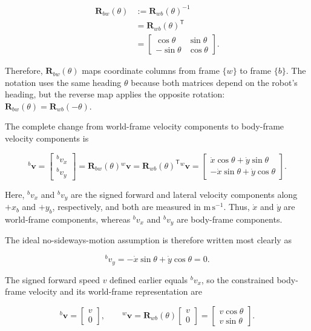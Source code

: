 \documentclass[
  australian,
  12pt,
  letterpaper,
  DIV=11,
  numbers=noendperiod,
  twoside]{scrreprt}
\begin{document}
\[
\begin{aligned}
\mathbf R_{bw}(\theta)
&\mathrel{:=}
\mathbf R_{wb}(\theta)^{-1}\\
&=
\mathbf R_{wb}(\theta)^{\mathsf T}\\
&=
\begin{bmatrix}
\cos\theta & \sin\theta\\
-\sin\theta & \cos\theta
\end{bmatrix}.
\end{aligned}
\]

Therefore, \(\mathbf R_{bw}(\theta)\) maps coordinate columns from frame
\(\{w\}\) to frame \(\{b\}\). The notation uses the same heading
\(\theta\) because both matrices depend on the robot's heading, but the
reverse map applies the opposite rotation:
\(\mathbf R_{bw}(\theta)=\mathbf R_{wb}(-\theta)\).

The complete change from world-frame velocity components to body-frame
velocity components is

\[
{}^{b}\mathbf v
=
\begin{bmatrix}
{}^{b}v_x\\
{}^{b}v_y
\end{bmatrix}
=
\mathbf R_{bw}(\theta){}^{w}\mathbf v
=
\mathbf R_{wb}(\theta)^{\mathsf T}{}^{w}\mathbf v
=
\begin{bmatrix}
\dot x\cos\theta+\dot y\sin\theta\\
-\dot x\sin\theta+\dot y\cos\theta
\end{bmatrix}.
\]

Here, \({}^{b}v_x\) and \({}^{b}v_y\) are the signed forward and lateral
velocity components along \(+x_b\) and \(+y_b\), respectively, and both
are measured in \(\mathrm{m\,s^{-1}}\). Thus, \(\dot x\) and \(\dot y\)
are world-frame components, whereas \({}^{b}v_x\) and \({}^{b}v_y\) are
body-frame components.

The ideal no-sideways-motion assumption is therefore written most
clearly as

\[
\boxed{
{}^{b}v_y
=
-\dot x\sin\theta+
\dot y\cos\theta
=
0
}.
\]

The signed forward speed \(v\) defined earlier equals \({}^{b}v_x\), so
the constrained body-frame velocity and its world-frame representation
are

\[
{}^{b}\mathbf v
=
\begin{bmatrix}
v\\
0
\end{bmatrix},
\qquad
{}^{w}\mathbf v
=
\mathbf R_{wb}(\theta)
\begin{bmatrix}
v\\
0
\end{bmatrix}
=
\begin{bmatrix}
v\cos\theta\\
v\sin\theta
\end{bmatrix}.
\]
\end{document}
